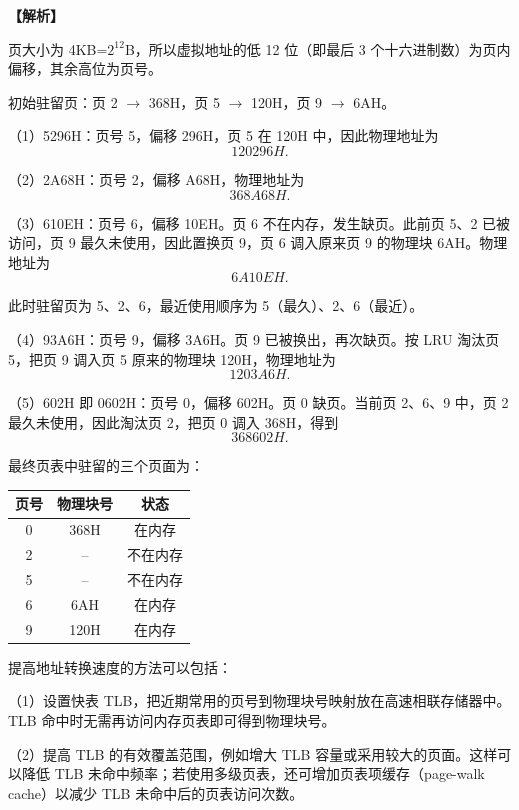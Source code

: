 \documentclass[UTF8,12pt]{ctexart}
\newenvironment{explanation}{\par\noindent\textbf{【解析】}\par\smallskip}{\par\medskip}
\begin{document}
\begin{explanation}
页大小为 4KB=$2^{12}$B，所以虚拟地址的低 12 位（即最后 3 个十六进制数）为页内偏移，其余高位为页号。

初始驻留页：页 2 $\to$ 368H，页 5 $\to$ 120H，页 9 $\to$ 6AH。

（1）5296H：页号 5，偏移 296H，页 5 在 120H 中，因此物理地址为
\[
\boxed{120296H}.
\]

（2）2A68H：页号 2，偏移 A68H，物理地址为
\[
\boxed{368A68H}.
\]

（3）610EH：页号 6，偏移 10EH。页 6 不在内存，发生缺页。此前页 5、2 已被访问，页 9 最久未使用，因此置换页 9，页 6 调入原来页 9 的物理块 6AH。物理地址为
\[
\boxed{6A10EH}.
\]

此时驻留页为 5、2、6，最近使用顺序为 5（最久）、2、6（最近）。

（4）93A6H：页号 9，偏移 3A6H。页 9 已被换出，再次缺页。按 LRU 淘汰页 5，把页 9 调入页 5 原来的物理块 120H，物理地址为
\[
\boxed{1203A6H}.
\]

（5）602H 即 0602H：页号 0，偏移 602H。页 0 缺页。当前页 2、6、9 中，页 2 最久未使用，因此淘汰页 2，把页 0 调入 368H，得到
\[
\boxed{368602H}.
\]

最终页表中驻留的三个页面为：
\begin{center}
\begin{tabular}{ccc}
\toprule
页号 & 物理块号 & 状态\\
\midrule
0 & 368H & 在内存\\
2 & -- & 不在内存\\
5 & -- & 不在内存\\
6 & 6AH & 在内存\\
9 & 120H & 在内存\\
\bottomrule
\end{tabular}
\end{center}

提高地址转换速度的方法可以包括：

（1）设置快表 TLB，把近期常用的页号到物理块号映射放在高速相联存储器中。TLB 命中时无需再访问内存页表即可得到物理块号。

（2）提高 TLB 的有效覆盖范围，例如增大 TLB 容量或采用较大的页面。这样可以降低 TLB 未命中频率；若使用多级页表，还可增加页表项缓存（page-walk cache）以减少 TLB 未命中后的页表访问次数。
\end{explanation}
\end{document}
